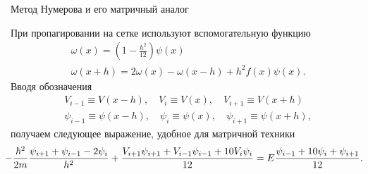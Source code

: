 \documentclass[10pt,pdf,hyperref={unicode},xcolor=dvipsnames]{beamer}
\newcommand{\lb}{\left(}
\newcommand{\rb}{\right)}
\begin{document}
\begin{frame}{Метод Нумерова и его матричный аналог}
    \begin{block}{}
        При пропагировании на сетке используют вспомогательную функцию 
        \begin{gather}
            \omega(x) =  \lb 1 - \frac{h^2}{12} \rb \psi(x) \\
            \omega(x + h) = 2\omega(x) - \omega(x-h) + h^2 f(x) \psi(x).
        \end{gather}
        Вводя обозначения
        \begin{gather}
            V_{i-1} \equiv V(x-h), \quad V_i \equiv V(x), \quad V_{i+1} \equiv V(x + h) \\
            \psi_{i - 1} \equiv \psi(x-h), \quad \psi_i \equiv \psi(x), \quad \psi_{i+1} \equiv \psi(x+h),
        \end{gather}
        получаем следующее выражение, удобное для матричной техники 
        \begin{gather}
            \hspace*{-0.3cm}
            -\frac{\hbar^2}{2 m} \frac{\psi_{i+1} + \psi_{i-1} - 2 \psi_i}{h^2} + \frac{V_{i+1} \psi_{i+1} + V_{i-1}\psi_{i-1}+10 V_i \psi_i}{12} = E \frac{\psi_{i-1} + 10 \psi_i + \psi_{i+1}}{12}. \notag 
        \end{gather}
    \end{block}
\end{frame}
\end{document}

